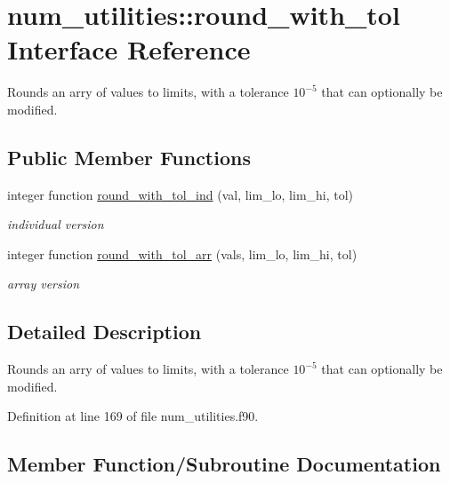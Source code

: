 \hypertarget{interfacenum__utilities_1_1round__with__tol}{}\section{num\+\_\+utilities\+:\+:round\+\_\+with\+\_\+tol Interface Reference}
\label{interfacenum__utilities_1_1round__with__tol}


Rounds an arry of values to limits, with a tolerance $10^{-5}$ that can optionally be modified.  


\subsection*{Public Member Functions}
\begin{DoxyCompactItemize}
\item 
integer function \hyperlink{interfacenum__utilities_1_1round__with__tol_ad224ab1533420f0d14b1b81afafb644d}{round\+\_\+with\+\_\+tol\+\_\+ind} (val, lim\+\_\+lo, lim\+\_\+hi, tol)
\begin{DoxyCompactList}\small\item\em individual version \end{DoxyCompactList}\item 
integer function \hyperlink{interfacenum__utilities_1_1round__with__tol_a722ab7e9eefd0e2ed83247b7fc3005e0}{round\+\_\+with\+\_\+tol\+\_\+arr} (vals, lim\+\_\+lo, lim\+\_\+hi, tol)
\begin{DoxyCompactList}\small\item\em array version \end{DoxyCompactList}\end{DoxyCompactItemize}


\subsection{Detailed Description}
Rounds an arry of values to limits, with a tolerance $10^{-5}$ that can optionally be modified. 

Definition at line 169 of file num\+\_\+utilities.\+f90.



\subsection{Member Function/\+Subroutine Documentation}
\mbox{\label{interfacenum__utilities_1_1round__with__tol_a722ab7e9eefd0e2ed83247b7fc3005e0}} 
